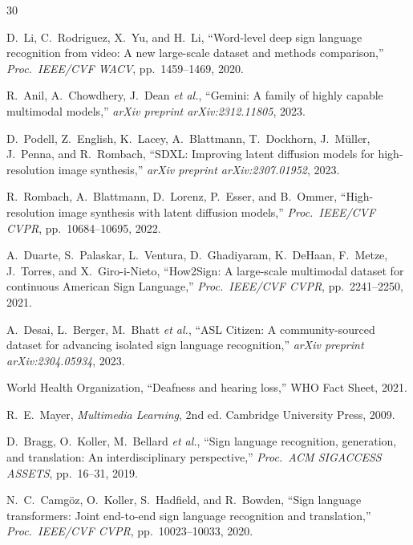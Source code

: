 \documentclass[12pt,a4paper,oneside]{report}
\begin{document}
\renewcommand\bibname{REFERENCES}

\begin{thebibliography}{30}

D.\ Li, C.\ Rodriguez, X.\ Yu, and H.\ Li,
``Word-level deep sign language recognition from video: A new large-scale dataset and methods comparison,''
\textit{Proc.\ IEEE/CVF WACV}, pp.\ 1459--1469, 2020.

R.\ Anil, A.\ Chowdhery, J.\ Dean \textit{et al.},
``Gemini: A family of highly capable multimodal models,''
\textit{arXiv preprint arXiv:2312.11805}, 2023.

D.\ Podell, Z.\ English, K.\ Lacey, A.\ Blattmann, T.\ Dockhorn, J.\ M\"uller, J.\ Penna, and R.\ Rombach,
``SDXL: Improving latent diffusion models for high-resolution image synthesis,''
\textit{arXiv preprint arXiv:2307.01952}, 2023.

R.\ Rombach, A.\ Blattmann, D.\ Lorenz, P.\ Esser, and B.\ Ommer,
``High-resolution image synthesis with latent diffusion models,''
\textit{Proc.\ IEEE/CVF CVPR}, pp.\ 10684--10695, 2022.

A.\ Duarte, S.\ Palaskar, L.\ Ventura, D.\ Ghadiyaram, K.\ DeHaan, F.\ Metze, J.\ Torres, and X.\ Giro-i-Nieto,
``How2Sign: A large-scale multimodal dataset for continuous American Sign Language,''
\textit{Proc.\ IEEE/CVF CVPR}, pp.\ 2241--2250, 2021.

A.\ Desai, L.\ Berger, M.\ Bhatt \textit{et al.},
``ASL Citizen: A community-sourced dataset for advancing isolated sign language recognition,''
\textit{arXiv preprint arXiv:2304.05934}, 2023.

World Health Organization,
``Deafness and hearing loss,''
WHO Fact Sheet, 2021.

R.\ E.\ Mayer,
\textit{Multimedia Learning}, 2nd ed.
Cambridge University Press, 2009.

D.\ Bragg, O.\ Koller, M.\ Bellard \textit{et al.},
``Sign language recognition, generation, and translation: An interdisciplinary perspective,''
\textit{Proc.\ ACM SIGACCESS ASSETS}, pp.\ 16--31, 2019.

N.\ C.\ Camg\"oz, O.\ Koller, S.\ Hadfield, and R.\ Bowden,
``Sign language transformers: Joint end-to-end sign language recognition and translation,''
\textit{Proc.\ IEEE/CVF CVPR}, pp.\ 10023--10033, 2020.


\end{thebibliography}
\end{document}
